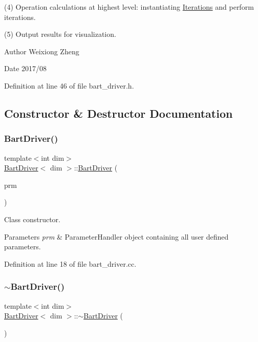 (4) Operation calculations at highest level\+: instantiating \hyperlink{class_iterations}{Iterations} and perform iterations.

(5) Output results for visualization.

\begin{DoxyAuthor}{Author}
Weixiong Zheng 
\end{DoxyAuthor}
\begin{DoxyDate}{Date}
2017/08 
\end{DoxyDate}


Definition at line 46 of file bart\+\_\+driver.\+h.



\subsection{Constructor \& Destructor Documentation}
\mbox{\label{class_bart_driver_acad3b3200543d46ab9e4c78b860f822c}} 
\subsubsection{\texorpdfstring{Bart\+Driver()}{BartDriver()}}
{\footnotesize\ttfamily template$<$int dim$>$ \\
\hyperlink{class_bart_driver}{Bart\+Driver}$<$ dim $>$\+::\hyperlink{class_bart_driver}{Bart\+Driver} (\begin{DoxyParamCaption}\item[{Parameter\+Handler \&}]{prm }\end{DoxyParamCaption})}

Class constructor.


\begin{DoxyParams}{Parameters}
{\em prm} & Parameter\+Handler object containing all user defined parameters. \\
\hline
\end{DoxyParams}


Definition at line 18 of file bart\+\_\+driver.\+cc.

\mbox{\label{class_bart_driver_aa89fe626d99cb4013b83d5e99698a9f3}} 
\subsubsection{\texorpdfstring{$\sim$\+Bart\+Driver()}{~BartDriver()}}
{\footnotesize\ttfamily template$<$int dim$>$ \\
\hyperlink{class_bart_driver}{Bart\+Driver}$<$ dim $>$\+::$\sim$\hyperlink{class_bart_driver}{Bart\+Driver} (\begin{DoxyParamCaption}{ }\end{DoxyParamCaption})}



